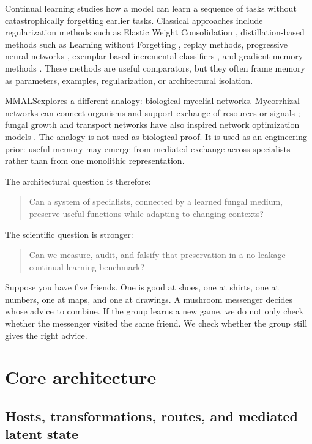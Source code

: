 \documentclass[11pt]{article}
\newcommand{\mmals}{\textsc{MMALS}}
\begin{document}
Continual learning studies how a model can learn a sequence of tasks without catastrophically forgetting earlier tasks. Classical approaches include regularization methods such as Elastic Weight Consolidation \citep{kirkpatrick2017ewc}, distillation-based methods such as Learning without Forgetting \citep{li2017lwf}, replay methods, progressive neural networks \citep{rusu2016pnn}, exemplar-based incremental classifiers \citep{rebuffi2017icarl}, and gradient memory methods \citep{lopezpaz2017gem,chaudhry2019agem}. These methods are useful comparators, but they often frame memory as parameters, examples, regularization, or architectural isolation.

\mmals explores a different analogy: biological mycelial networks. Mycorrhizal networks can connect organisms and support exchange of resources or signals \citep{simard1997mycorrhizal}; fungal growth and transport networks have also inspired network optimization models \citep{bebber2007biological}. The analogy is not used as biological proof. It is used as an engineering prior: useful memory may emerge from mediated exchange across specialists rather than from one monolithic representation.

The architectural question is therefore:
\begin{quote}
Can a system of specialists, connected by a learned fungal medium, preserve useful functions while adapting to changing contexts?
\end{quote}

The scientific question is stronger:
\begin{quote}
Can we measure, audit, and falsify that preservation in a no-leakage continual-learning benchmark?
\end{quote}

\begin{kidbox}
Suppose you have five friends. One is good at shoes, one at shirts, one at numbers, one at maps, and one at drawings. A mushroom messenger decides whose advice to combine. If the group learns a new game, we do not only check whether the messenger visited the same friend. We check whether the group still gives the right advice.
\end{kidbox}

\section{Core architecture}

\subsection{Hosts, transformations, routes, and mediated latent state}
\end{document}
